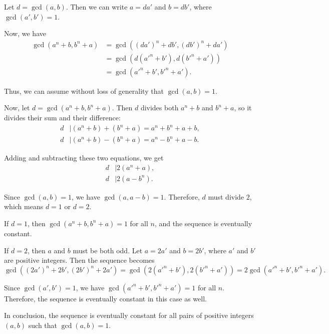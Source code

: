 Let $d = \gcd(a,b)$. Then we can write $a = da'$ and $b = db'$, where $\gcd(a',b') = 1$. 

Now, we have
\begin{align*}
\gcd(a^n+b, b^n+a) &= \gcd((da')^n + db', (db')^n + da') \\
&= \gcd(d(a'^n+b'), d(b'^n+a')) \\
&= \gcd(a'^n+b', b'^n+a').
\end{align*}

Thus, we can assume without loss of generality that $\gcd(a,b) = 1$. 

Now, let $d = \gcd(a^n+b, b^n+a)$. Then $d$ divides both $a^n+b$ and $b^n+a$, so it divides their sum and their difference:
\begin{align*}
d &\mid (a^n+b) + (b^n+a) = a^n + b^n + a + b, \\
d &\mid (a^n+b) - (b^n+a) = a^n - b^n + a - b.
\end{align*}

Adding and subtracting these two equations, we get
\begin{align*}
d &\mid 2(a^n + a), \\
d &\mid 2(a - b^n).
\end{align*}

Since $\gcd(a,b) = 1$, we have $\gcd(a,a-b) = 1$. Therefore, $d$ must divide $2$, which means $d = 1$ or $d = 2$. 

If $d = 1$, then $\gcd(a^n+b, b^n+a) = 1$ for all $n$, and the sequence is eventually constant.

If $d = 2$, then $a$ and $b$ must be both odd. Let $a = 2a'$ and $b = 2b'$, where $a'$ and $b'$ are positive integers. Then the sequence becomes
\[
\gcd((2a')^n + 2b', (2b')^n + 2a') = \gcd(2(a'^n+b'), 2(b'^n+a')) = 2\gcd(a'^n+b', b'^n+a').
\]

Since $\gcd(a',b') = 1$, we have $\gcd(a'^n+b', b'^n+a') = 1$ for all $n$. Therefore, the sequence is eventually constant in this case as well.

In conclusion, the sequence is eventually constant for all pairs of positive integers $(a,b)$ such that $\gcd(a,b) = 1$.
